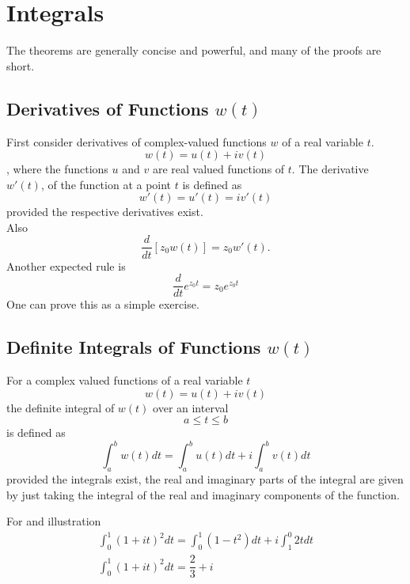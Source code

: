 \chapter{Integrals}
The theorems are generally concise and powerful, and many of the proofs are short. 
\section{Derivatives of Functions $ w(t) $}
First consider derivatives of complex-valued functions $ w $ of a real variable $ t $.
\[ w(t) = u(t) + iv(t) \], 
where the functions $ u $ and $ v $ are real valued functions of $ t $. The derivative $ w'(t) $, 
of the function at a point $ t $ is defined as 
\[ w'(t) = u'(t) = iv'(t) \] 
provided the respective derivatives exist. \\Also 
\[ \dfrac{d}{dt}[z_0 w(t)] = z_0 w'(t). \] Another expected rule is 
\[ \dfrac{d}{dt} e^{z_0t} = z_0 e^{z_0 t}\]
One can prove this as a simple exercise. 
\section{Definite Integrals of Functions $ w(t) $}
For a complex valued functions of a real variable $ t $ 
\[ w(t) = u(t) + iv(t) \] the definite integral of $ w(t) $ over an interval \[ a\leq t \leq b \] is defined as 
\[ \int_{a}^{b}w(t)dt = \int_{a}^{b}u(t)dt + i\int_{a}^{b}v(t)dt \] provided the integrals exist, the real and imaginary parts of the integral are given by just taking the integral of the real and imaginary components of the function. 
\begin{example}
	For and illustration 
	\begin{gather}
		\int_{0}^{1}(1+it)^2 dt = \int_{0}^{1}(1-t^2)dt + i \int_{1}^{0}2t dt \\
		\int_{0}^{1}(1+it)^2 dt = \dfrac{2}{3} + i
	\end{gather}
\end{example}
